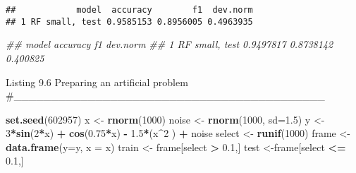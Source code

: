 \documentclass[]{article}
\newenvironment{Shaded}{\begin{snugshade}}{\end{snugshade}}
\newcommand{\CommentTok}[1]{\textcolor[rgb]{0.56,0.35,0.01}{\textit{#1}}}
\newcommand{\DataTypeTok}[1]{\textcolor[rgb]{0.13,0.29,0.53}{#1}}
\newcommand{\DecValTok}[1]{\textcolor[rgb]{0.00,0.00,0.81}{#1}}
\newcommand{\FloatTok}[1]{\textcolor[rgb]{0.00,0.00,0.81}{#1}}
\newcommand{\KeywordTok}[1]{\textcolor[rgb]{0.13,0.29,0.53}{\textbf{#1}}}
\newcommand{\NormalTok}[1]{#1}
\newcommand{\OperatorTok}[1]{\textcolor[rgb]{0.81,0.36,0.00}{\textbf{#1}}}
\newcommand{\StringTok}[1]{\textcolor[rgb]{0.31,0.60,0.02}{#1}}
\begin{document}
\begin{Shaded}
\end{Shaded}

\begin{verbatim}
##            model  accuracy        f1  dev.norm
## 1 RF small, test 0.9585153 0.8956005 0.4963935
\end{verbatim}

\begin{Shaded}
\begin{Highlighting}[]
\CommentTok{## model accuracy f1 dev.norm}
\CommentTok{## 1 RF small, test 0.9497817 0.8738142 0.400825}
\end{Highlighting}
\end{Shaded}

Listing 9.6 Preparing an artificial problem
\#\_\_\_\_\_\_\_\_\_\_\_\_\_\_\_\_\_\_\_\_\_\_\_\_\_\_\_\_\_\_\_\_\_\_\_\_\_\_\_\_\_\_

\begin{Shaded}
\begin{Highlighting}[]
\KeywordTok{set.seed}\NormalTok{(}\DecValTok{602957}\NormalTok{)}
\NormalTok{x <-}\StringTok{ }\KeywordTok{rnorm}\NormalTok{(}\DecValTok{1000}\NormalTok{)}
\NormalTok{noise <-}\StringTok{ }\KeywordTok{rnorm}\NormalTok{(}\DecValTok{1000}\NormalTok{, }\DataTypeTok{sd=}\FloatTok{1.5}\NormalTok{)}
\NormalTok{y <-}\StringTok{ }\DecValTok{3}\OperatorTok{*}\KeywordTok{sin}\NormalTok{(}\DecValTok{2}\OperatorTok{*}\NormalTok{x) }\OperatorTok{+}\StringTok{ }\KeywordTok{cos}\NormalTok{(}\FloatTok{0.75}\OperatorTok{*}\NormalTok{x) }\OperatorTok{-}\StringTok{ }\FloatTok{1.5}\OperatorTok{*}\NormalTok{(x}\OperatorTok{^}\DecValTok{2}\NormalTok{ ) }\OperatorTok{+}\StringTok{ }\NormalTok{noise}
\NormalTok{select <-}\StringTok{ }\KeywordTok{runif}\NormalTok{(}\DecValTok{1000}\NormalTok{)}
\NormalTok{frame <-}\StringTok{ }\KeywordTok{data.frame}\NormalTok{(}\DataTypeTok{y=}\NormalTok{y, }\DataTypeTok{x =}\NormalTok{ x)}
\NormalTok{train <-}\StringTok{ }\NormalTok{frame[select }\OperatorTok{>}\StringTok{ }\FloatTok{0.1}\NormalTok{,]}
\NormalTok{test <-frame[select }\OperatorTok{<=}\StringTok{ }\FloatTok{0.1}\NormalTok{,]}
\end{Highlighting}
\end{Shaded}
\end{document}
